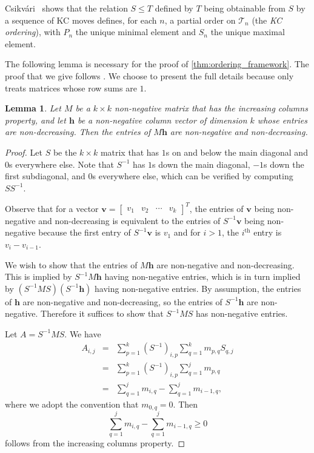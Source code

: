 \documentclass[11pt]{article}
\newtheorem{lemma}[theorem]{Lemma}
\theoremstyle{definition}
\newcommand{\ith}[1]{$#1^{\text{th}}$}
\begin{document}
Csikv\'ari~\cite[Remark 2.4]{Csikvari2010} shows that the relation $S \le T$ defined by $T$ being obtainable from $S$ by a sequence of KC moves defines, for each $n$, a partial order on ${\mathcal T}_n$ (the {\it KC ordering}), with $P_n$ the unique minimal element and $S_n$ the unique maximal element.

The following lemma is necessary for the proof of \cref{thm:ordering_framework}. The proof that we give follows \cite[Theorem 1.1, $(a) \Rightarrow (c)$]{KeilsonKester1977}. We choose to present the full details because \cite{KeilsonKester1977} only treats matrices whose row sums are $1$. 

\begin{lemma} \label{lem:matrix_prop}
Let $M$ be a $k \times k$ non-negative matrix that has the increasing columns property, and let ${\mathbf h}$ be a non-negative column vector of dimension $k$ whose entries are non-decreasing. Then the entries of $M{\mathbf h}$ are non-negative and non-decreasing.
\end{lemma}

\begin{proof}
Let $S$ be the $k \times k$ matrix that has $1$s on and below the main diagonal and $0$s everywhere else. Note that $S^{-1}$ has $1$s down the main diagonal, $-1$s down the first subdiagonal, and $0$s everywhere else, which can be verified by computing $SS^{-1}$.

Observe that for a vector ${\mathbf v}=\begin{bmatrix} v_1 & v_2 & \cdots & v_k \end{bmatrix}^T$, the entries of ${\mathbf v}$ being non-negative and non-decreasing is equivalent to the entries of $S^{-1}{\mathbf v}$ being non-negative because the first entry of $S^{-1}{\mathbf v}$ is $v_1$ and for $i > 1$, the \ith{i} entry is $v_i-v_{i-1}$. 

We wish to show that the entries of $M{\mathbf h}$ are non-negative and non-decreasing. This is implied by $S^{-1}M{\mathbf h}$ having non-negative entries, which is in turn implied by $(S^{-1}MS)(S^{-1}{\mathbf h})$ having non-negative entries. By assumption, the entries of ${\mathbf h}$ are non-negative and non-decreasing, so the entries of $S^{-1}{\mathbf h}$ are non-negative. Therefore it suffices to show that $S^{-1}MS$ has non-negative entries. 

Let $A=S^{-1}MS$. We have
\begin{eqnarray*}
A_{i,j} & = & \sum_{p=1}^k (S^{-1})_{i,p} \sum_{q=1}^k m_{p,q}S_{q,j} \\
& = & \sum_{p=1}^k (S^{-1})_{i,p} \sum_{q=1}^j m_{p,q} \\
& = & \sum_{q=1}^j m_{i,q} - \sum_{q=1}^j m_{i-1,q},
\end{eqnarray*}
where we adopt the convention that $m_{0,q}=0$. Then
\[\sum_{q=1}^j m_{i,q} - \sum_{q=1}^j m_{i-1,q} \ge 0\]
follows from the increasing columns property. 
\end{proof}
\end{document}
